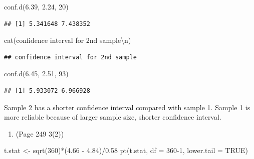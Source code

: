 \documentclass{article}
\newenvironment{Shaded}{\begin{snugshade}}{\end{snugshade}}
\newcommand{\AttributeTok}[1]{\textcolor[rgb]{0.77,0.63,0.00}{#1}}
\newcommand{\ConstantTok}[1]{\textcolor[rgb]{0.00,0.00,0.00}{#1}}
\newcommand{\DecValTok}[1]{\textcolor[rgb]{0.00,0.00,0.81}{#1}}
\newcommand{\FloatTok}[1]{\textcolor[rgb]{0.00,0.00,0.81}{#1}}
\newcommand{\FunctionTok}[1]{\textcolor[rgb]{0.00,0.00,0.00}{#1}}
\newcommand{\NormalTok}[1]{#1}
\newcommand{\OtherTok}[1]{\textcolor[rgb]{0.56,0.35,0.01}{#1}}
\newcommand{\SpecialCharTok}[1]{\textcolor[rgb]{0.00,0.00,0.00}{#1}}
\newcommand{\StringTok}[1]{\textcolor[rgb]{0.31,0.60,0.02}{#1}}
\begin{document}
\begin{Shaded}
\begin{Highlighting}[]
\FunctionTok{conf.d}\NormalTok{(}\FloatTok{6.39}\NormalTok{, }\FloatTok{2.24}\NormalTok{, }\DecValTok{20}\NormalTok{)}
\end{Highlighting}
\end{Shaded}

\begin{verbatim}
## [1] 5.341648 7.438352
\end{verbatim}

\begin{Shaded}
\begin{Highlighting}[]
\FunctionTok{cat}\NormalTok{(}\StringTok{\textquotesingle{}confidence interval for 2nd sample}\SpecialCharTok{\textbackslash{}n}\StringTok{\textquotesingle{}}\NormalTok{)}
\end{Highlighting}
\end{Shaded}

\begin{verbatim}
## confidence interval for 2nd sample
\end{verbatim}

\begin{Shaded}
\begin{Highlighting}[]
\FunctionTok{conf.d}\NormalTok{(}\FloatTok{6.45}\NormalTok{, }\FloatTok{2.51}\NormalTok{, }\DecValTok{93}\NormalTok{)}
\end{Highlighting}
\end{Shaded}

\begin{verbatim}
## [1] 5.933072 6.966928
\end{verbatim}

Sample 2 has a shorter confidence interval compared with sample 1.
Sample 1 is more reliable because of larger sample size, shorter
confidence interval.

\begin{enumerate}
\def\labelenumi{\arabic{enumi}.}
\setcounter{enumi}{1}
\tightlist
\item
  (Page 249 3(2))
\end{enumerate}

\begin{Shaded}
\begin{Highlighting}[]
\NormalTok{t.stat }\OtherTok{\textless{}{-}} \FunctionTok{sqrt}\NormalTok{(}\DecValTok{360}\NormalTok{)}\SpecialCharTok{*}\NormalTok{(}\FloatTok{4.66} \SpecialCharTok{{-}} \FloatTok{4.84}\NormalTok{)}\SpecialCharTok{/}\FloatTok{0.58}
\FunctionTok{pt}\NormalTok{(t.stat, }\AttributeTok{df =} \DecValTok{360{-}1}\NormalTok{, }\AttributeTok{lower.tail =} \ConstantTok{TRUE}\NormalTok{)}
\end{Highlighting}
\end{Shaded}
\end{document}

